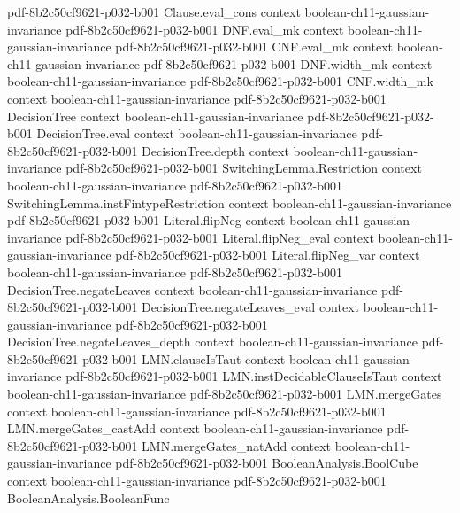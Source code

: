 \begin{theorem}
  {pdf-8b2c50cf9621-p032-b001}
\proofstep
  {Clause.eval_cons}
  {context}
  {boolean-ch11-gaussian-invariance}
  {pdf-8b2c50cf9621-p032-b001}
\proofstep
  {DNF.eval_mk}
  {context}
  {boolean-ch11-gaussian-invariance}
  {pdf-8b2c50cf9621-p032-b001}
\proofstep
  {CNF.eval_mk}
  {context}
  {boolean-ch11-gaussian-invariance}
  {pdf-8b2c50cf9621-p032-b001}
\proofstep
  {DNF.width_mk}
  {context}
  {boolean-ch11-gaussian-invariance}
  {pdf-8b2c50cf9621-p032-b001}
\proofstep
  {CNF.width_mk}
  {context}
  {boolean-ch11-gaussian-invariance}
  {pdf-8b2c50cf9621-p032-b001}
\proofstep
  {DecisionTree}
  {context}
  {boolean-ch11-gaussian-invariance}
  {pdf-8b2c50cf9621-p032-b001}
\proofstep
  {DecisionTree.eval}
  {context}
  {boolean-ch11-gaussian-invariance}
  {pdf-8b2c50cf9621-p032-b001}
\proofstep
  {DecisionTree.depth}
  {context}
  {boolean-ch11-gaussian-invariance}
  {pdf-8b2c50cf9621-p032-b001}
\proofstep
  {SwitchingLemma.Restriction}
  {context}
  {boolean-ch11-gaussian-invariance}
  {pdf-8b2c50cf9621-p032-b001}
\proofstep
  {SwitchingLemma.instFintypeRestriction}
  {context}
  {boolean-ch11-gaussian-invariance}
  {pdf-8b2c50cf9621-p032-b001}
\proofstep
  {Literal.flipNeg}
  {context}
  {boolean-ch11-gaussian-invariance}
  {pdf-8b2c50cf9621-p032-b001}
\proofstep
  {Literal.flipNeg_eval}
  {context}
  {boolean-ch11-gaussian-invariance}
  {pdf-8b2c50cf9621-p032-b001}
\proofstep
  {Literal.flipNeg_var}
  {context}
  {boolean-ch11-gaussian-invariance}
  {pdf-8b2c50cf9621-p032-b001}
\proofstep
  {DecisionTree.negateLeaves}
  {context}
  {boolean-ch11-gaussian-invariance}
  {pdf-8b2c50cf9621-p032-b001}
\proofstep
  {DecisionTree.negateLeaves_eval}
  {context}
  {boolean-ch11-gaussian-invariance}
  {pdf-8b2c50cf9621-p032-b001}
\proofstep
  {DecisionTree.negateLeaves_depth}
  {context}
  {boolean-ch11-gaussian-invariance}
  {pdf-8b2c50cf9621-p032-b001}
\proofstep
  {LMN.clauseIsTaut}
  {context}
  {boolean-ch11-gaussian-invariance}
  {pdf-8b2c50cf9621-p032-b001}
\proofstep
  {LMN.instDecidableClauseIsTaut}
  {context}
  {boolean-ch11-gaussian-invariance}
  {pdf-8b2c50cf9621-p032-b001}
\proofstep
  {LMN.mergeGates}
  {context}
  {boolean-ch11-gaussian-invariance}
  {pdf-8b2c50cf9621-p032-b001}
\proofstep
  {LMN.mergeGates_castAdd}
  {context}
  {boolean-ch11-gaussian-invariance}
  {pdf-8b2c50cf9621-p032-b001}
\proofstep
  {LMN.mergeGates_natAdd}
  {context}
  {boolean-ch11-gaussian-invariance}
  {pdf-8b2c50cf9621-p032-b001}
\proofstep
  {BooleanAnalysis.BoolCube}
  {context}
  {boolean-ch11-gaussian-invariance}
  {pdf-8b2c50cf9621-p032-b001}
\proofstep
  {BooleanAnalysis.BooleanFunc}

\end{theorem}
